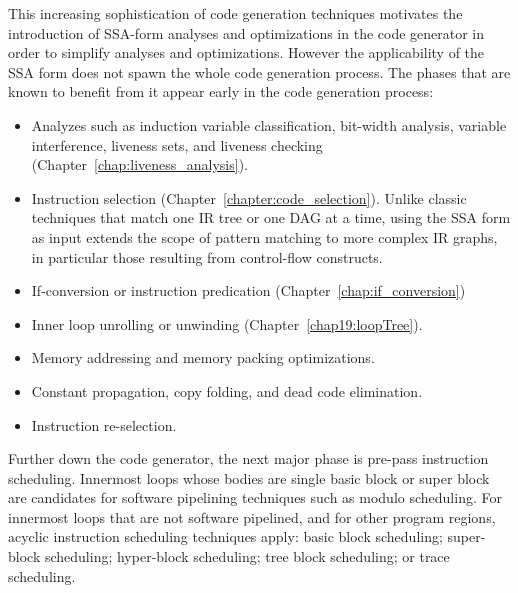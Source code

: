 This increasing sophistication of code generation techniques motivates the
introduction of SSA-form analyses and optimizations in the code generator in
order to simplify analyses and optimizations. However the applicability of the SSA
form does not spawn the whole code generation process. The phases that are known
to benefit from it appear early in the code generation process:
\begin{itemize}

\item Analyzes such as induction variable classification, bit-width analysis,
variable interference, liveness sets, and liveness checking
(Chapter~\ref{chap:liveness_analysis}).

\item Instruction selection (Chapter~\ref{chapter:code_selection}). Unlike
classic techniques that match one IR tree or one DAG at a time, using the SSA
form as input extends the scope of pattern matching to more complex IR graphs,
in particular those resulting from control-flow constructs.

\item If-conversion or instruction predication (Chapter~\ref{chap:if_conversion})

\item Inner loop unrolling or unwinding (Chapter~\ref{chap19:loopTree}).

\item Memory addressing and memory packing optimizations.

\item Constant propagation, copy folding, and dead code elimination.

\item Instruction re-selection.

\end{itemize} \medskip

Further down the code generator, the next major phase is pre-pass instruction
scheduling. Innermost loops whose bodies are single basic block or super
block are candidates for software pipelining techniques such as modulo
scheduling. For innermost loops that are not software pipelined, and for other
program regions, acyclic instruction scheduling techniques apply: basic block
scheduling; super-block scheduling; hyper-block scheduling; tree block
scheduling; or trace scheduling.

